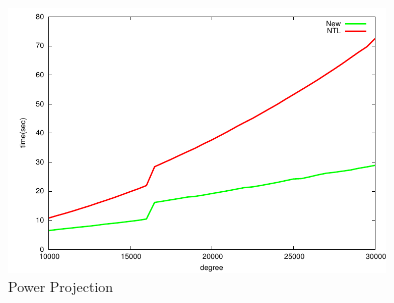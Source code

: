 \begin{figure}[ht]
\setlength{\abovecaptionskip}{-0.5cm}
\begin{center}
\includegraphics[width = 10cm]{figures/powerProjectTiming.pdf}
\end{center}
\caption{\small Power Projection}
\label{figure:powerp}
\end{figure}


